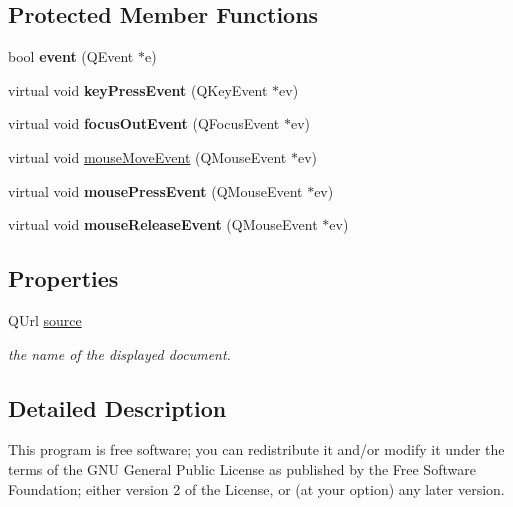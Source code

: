 \subsection*{Protected Member Functions}
\begin{DoxyCompactItemize}
\item 
\hypertarget{classraEdit_a72526183c90d6c582c94fb1393e7b645}{
bool {\bfseries event} (QEvent $\ast$e)}
\label{classraEdit_a72526183c90d6c582c94fb1393e7b645}

\item 
\hypertarget{classraEdit_ab7427daba72eb2ab5368bd8688515b9c}{
virtual void {\bfseries keyPressEvent} (QKeyEvent $\ast$ev)}
\label{classraEdit_ab7427daba72eb2ab5368bd8688515b9c}

\item 
\hypertarget{classraEdit_ace8754d07d9d013047e47c5d47a10401}{
virtual void {\bfseries focusOutEvent} (QFocusEvent $\ast$ev)}
\label{classraEdit_ace8754d07d9d013047e47c5d47a10401}

\item 
virtual void \hyperlink{classraEdit_a6a21025d7abaa643d260449c5342a4d4}{mouseMoveEvent} (QMouseEvent $\ast$ev)
\item 
\hypertarget{classraEdit_afb940fa4fd4adb7007f0a7639323f53b}{
virtual void {\bfseries mousePressEvent} (QMouseEvent $\ast$ev)}
\label{classraEdit_afb940fa4fd4adb7007f0a7639323f53b}

\item 
\hypertarget{classraEdit_a5a7773207866caf1624a2b3da16c3944}{
virtual void {\bfseries mouseReleaseEvent} (QMouseEvent $\ast$ev)}
\label{classraEdit_a5a7773207866caf1624a2b3da16c3944}

\end{DoxyCompactItemize}
\subsection*{Properties}
\begin{DoxyCompactItemize}
\item 
QUrl \hyperlink{classraEdit_a1609b3812b97d26b500990cb2801c0f1}{source}
\begin{DoxyCompactList}\small\item\em the name of the displayed document. \item\end{DoxyCompactList}\end{DoxyCompactItemize}


\subsection{Detailed Description}
This program is free software; you can redistribute it and/or modify it under the terms of the GNU General Public License as published by the Free Software Foundation; either version 2 of the License, or (at your option) any later version.

